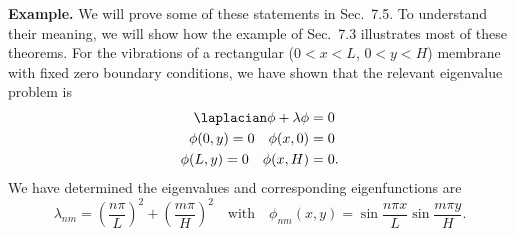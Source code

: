 \textbf{Example.}  We will prove some of these statements in Sec.~7.5.  To understand their meaning, we will show how the example of Sec.~7.3 illustrates most of these theorems.  For the vibrations of a rectangular ($0 < x < L$, $0 < y < H$) membrane with fixed zero boundary conditions, we have shown that the relevant eigenvalue problem is
\begin{equation}
\begin{aligned}
\laplacian\phi + \lambda\phi &= 0 \\
\phi(0,y) = 0 \quad \phi(x,0) &= 0 \\
\phi(L,y) = 0 \quad \phi(x,H) &= 0.
\end{aligned}
\label{eq:7.4.7}
\end{equation}
We have determined the eigenvalues and corresponding eigenfunctions are
\begin{equation}
\lambda_{nm} = \left(\frac{n\pi}{L}\right)^2 + \left(\frac{m\pi}{H}\right)^2 \quad\text{with}\quad
\phi_{nm}(x,y) = \sin\frac{n\pi x}{L}\sin\frac{m\pi y}{H}.
\label{eq:7.4.8}
\end{equation}

